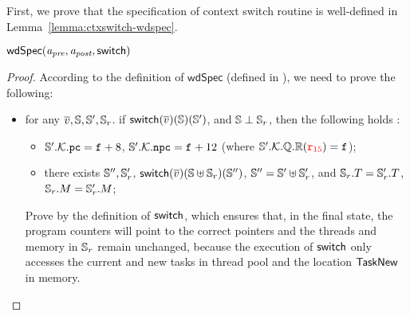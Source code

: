First, we prove that the specification of 
context switch routine is well-defined in 
Lemma~\ref{lemma:ctxswitch-wdspec}.
\begin{lemma}
    \em
    \label{lemma:ctxswitch-wdspec}
    $\textsf{wdSpec}({\textit{a}_\textit{pre}}, {\textit{a}_\textit{post}}, {\mathsf{switch}})$
\end{lemma}
\begin{proof}
    According to the definition of 
    $\textsf{wdSpec}$ (defined in 
    \Def{\ref{def:well-defined specification}}), 
    we need to prove the following:
    \begin{itemize}
        \item for any $\overline{v}, \mathbb{S}, \mathbb{S}', \mathbb{S}_r$. 
        if $\mathsf{switch}(\overline{v})(\mathbb{S})(\mathbb{S}')$, and 
        $\mathbb{S} \perp \mathbb{S}_r$, 
        then the following holds : 
        \begin{itemize}
            \small
            \item $\mathbb{S}'.\mathcal{K}.\texttt{pc} = \texttt{f}_{} + 8$, 
                $\mathbb{S}'.\mathcal{K}.\texttt{npc} = \texttt{f}_{} + 12$
                (where $\mathbb{S}'.\mathcal{K}.\mathbb{Q}.\mathbb{R}
                    ({\color{red} \texttt{r}_{15}}) = \texttt{f}_{}$);
            \item there exists $\mathbb{S}'', \mathbb{S}_r'$, 
                $\mathsf{switch}(\overline{v})(\mathbb{S} \uplus \mathbb{S}_r) 
                    (\mathbb{S}'')$, $\mathbb{S}'' = \mathbb{S}' \uplus \mathbb{S}_r'$, 
                and $\mathbb{S}_r.T = \mathbb{S}_r'.T$, 
                $\mathbb{S}_r.M = \mathbb{S}_r'.M$; 
        \end{itemize}

        Prove by the definition of $\mathsf{switch}$, which 
        ensures that, in the final state, 
        the program counters will point to 
        the correct pointers and the threads and 
        memory in $\mathbb{S}_r$ remain unchanged, 
        because the execution of $\mathsf{switch}$ only accesses 
        the current and new tasks in thread pool 
        and the location $\mathsf{TaskNew}$ in memory.



\end{itemize}
\end{proof}
